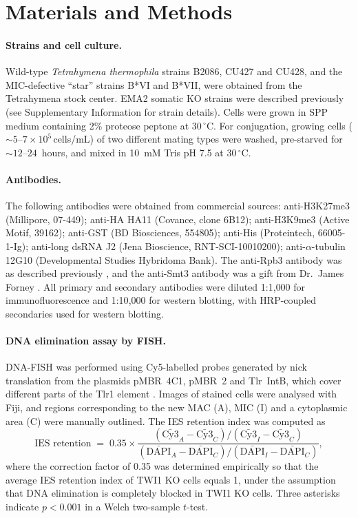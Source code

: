 \documentclass[11pt]{article}
\begin{document}


\section{Materials and Methods}

\paragraph{Strains and cell culture.}
Wild-type \emph{Tetrahymena thermophila} strains B2086, CU427 and CU428,
and the MIC-defective ``star'' strains B*VI and B*VII, were obtained from
the Tetrahymena stock center. EMA2 somatic KO strains were described
previously (see Supplementary Information for strain details). Cells were
grown in SPP medium containing 2\% proteose peptone at $30\,^{\circ}$C.
For conjugation, growing cells (${\sim}5$--$7 \times 10^{5}$\,cells/mL)
of two different mating types were washed, pre-starved for
${\sim}12$--$24$~hours, and mixed in 10~mM Tris pH 7.5 at $30\,^{\circ}$C.

\paragraph{Antibodies.}
The following antibodies were obtained from commercial sources:
anti-H3K27me3 (Millipore, 07-449); anti-HA HA11 (Covance, clone 6B12);
anti-H3K9me3 (Active Motif, 39162); anti-GST (BD Biosciences, 554805);
anti-His (Proteintech, 66005-1-Ig); anti-long dsRNA J2 (Jena Bioscience,
RNT-SCI-10010200); anti-$\alpha$-tubulin 12G10 (Developmental Studies
Hybridoma Bank). The anti-Rpb3 antibody was as described previously
\citep{mochizuki2004rpb3}, and the anti-Smt3 antibody was a gift from
Dr.~James Forney \citep{nasir2015sumo}. All primary and secondary
antibodies were diluted 1:1{,}000 for immunofluorescence and 1:10{,}000
for western blotting, with HRP-coupled secondaries used for western
blotting.

\paragraph{DNA elimination assay by FISH.}
DNA-FISH was performed using Cy5-labelled probes generated by nick
translation from the plasmids pMBR~4C1, pMBR~2 and Tlr~IntB, which cover
different parts of the Tlr1 element \citep{cheng2010transposase}. Images
of stained cells were analysed with Fiji, and regions corresponding to
the new MAC (A), MIC (I) and a cytoplasmic area (C) were manually
outlined. The IES retention index was computed as
\[
\text{IES retention} \;=\;
0.35 \times \frac{(\bar{\text{Cy3}}_A - \bar{\text{Cy3}}_C) /
(\bar{\text{Cy3}}_I - \bar{\text{Cy3}}_C)}
{(\bar{\text{DAPI}}_A - \bar{\text{DAPI}}_C) /
(\bar{\text{DAPI}}_I - \bar{\text{DAPI}}_C)} ,
\]
where the correction factor of 0.35 was determined empirically so that the
average IES retention index of TWI1 KO cells equals 1, under the
assumption that DNA elimination is completely blocked in TWI1 KO cells.
Three asterisks indicate $p < 0.001$ in a Welch two-sample $t$-test.
\end{document}

